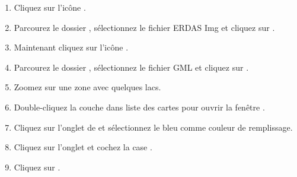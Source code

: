 

\begin{enumerate} \item Cliquez sur l'icône .
\item Parcourez le dossier , sélectionnez le fichier ERDAS Img  et cliquez sur .
\item Maintenant cliquez sur l'icône .
\item Parcourez le dossier , sélectionnez le fichier GML  et cliquez sur .
\item Zoomez sur une zone avec quelques lacs.
\item Double-cliquez la couche  dans liste des cartes pour ouvrir la fenêtre .
\item Cliquez sur l'onglet de  et sélectionnez le bleu comme couleur de remplissage.
\item Cliquez sur l'onglet  et cochez la case .
\item Cliquez sur .
\end{enumerate} 


